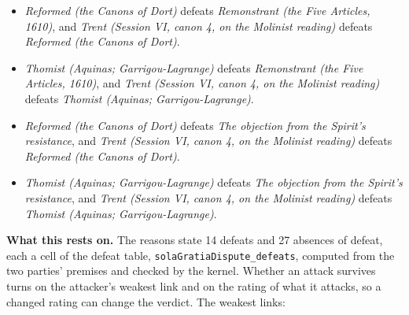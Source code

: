 \documentclass[11pt]{article}
\begin{document}
\begin{itemize}
\begin{itemize}
\item \emph{Reformed (the Canons of Dort)} defeats \emph{Remonstrant (the Five Articles, 1610)}, and \emph{Trent (Session VI, canon 4, on the Molinist reading)} defeats \emph{Reformed (the Canons of Dort)}.
\item \emph{Thomist (Aquinas; Garrigou-Lagrange)} defeats \emph{Remonstrant (the Five Articles, 1610)}, and \emph{Trent (Session VI, canon 4, on the Molinist reading)} defeats \emph{Thomist (Aquinas; Garrigou-Lagrange)}.
\item \emph{Reformed (the Canons of Dort)} defeats \emph{The objection from the Spirit’s resistance}, and \emph{Trent (Session VI, canon 4, on the Molinist reading)} defeats \emph{Reformed (the Canons of Dort)}.
\item \emph{Thomist (Aquinas; Garrigou-Lagrange)} defeats \emph{The objection from the Spirit’s resistance}, and \emph{Trent (Session VI, canon 4, on the Molinist reading)} defeats \emph{Thomist (Aquinas; Garrigou-Lagrange)}.
\end{itemize}
\end{itemize}
\par\noindent\textbf{What this rests on.} The reasons state 14 defeats and 27 absences of defeat, each a cell of the defeat table, \texttt{sola\allowbreak{}Gratia\allowbreak{}Dispute\_\allowbreak{}defeats}, computed from the two parties' premises and checked by the kernel. Whether an attack survives turns on the attacker's weakest link and on the rating of what it attacks, so a changed rating can change the verdict. The weakest links:
\end{document}

